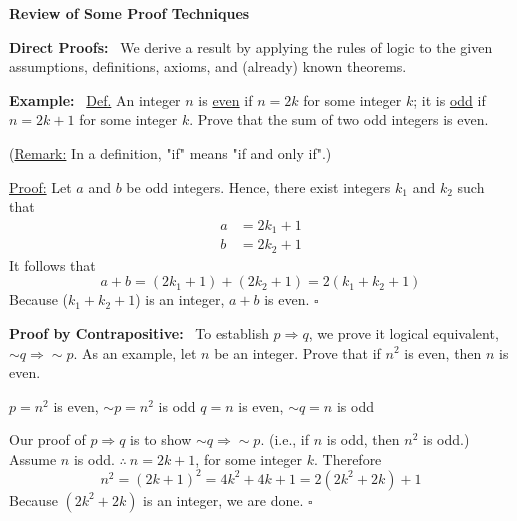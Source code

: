 \documentclass[letterpaper]{article}
\begin{document}
\Large
\begin{center}
\textbf{Review of Some Proof Techniques}
\end{center}

\noindent\textbf{Direct Proofs:}~ We derive a result by applying the rules of logic to the given assumptions, definitions, axioms, and (already) known theorems.

\noindent\textbf{Example:}~
    \newline\underline{Def.} An integer $n$ is \underline{even} if $n = 2k$ for some integer $k$; it is \underline{odd} if \ $n = 2k+1$ for some integer $k$. Prove that the sum of two odd integers is even.

\noindent (\underline{Remark:} In a definition, "if" means "if and only if".)

\noindent \underline{Proof:} Let $a$ and $b$ be odd integers.
    \newline
    Hence, there exist integers $k_1$ and $k_2$ such that
    \begin{align*}
        a &= 2k_1+1\\
        b &= 2k_2+1
    \end{align*}
    It follows that
    \begin{equation*}
        a+b = (2k_1+1) + (2k_2+1) = 2(k_1+k_2+1)
    \end{equation*}
    Because ($k_1+k_2+1$) is an integer, $a+b$ is even. $\square$

\noindent \textbf{Proof by Contrapositive:}~ To establish $p \Rightarrow q$, we prove it logical equivalent, $\sim q \Rightarrow \sim p$.
    \newline\newline
    As an example, let $n$ be an integer. Prove that if $n^2$ is even, then $n$ is even.

    $p = n^2$ is even, $\sim p = n^2$ is odd
    \newline
    $q = n$ is even, $\sim q = n$ is odd

    Our proof of $p \Rightarrow q$ is to show $\sim q \Rightarrow \sim p$. (i.e., if $n$ is odd, then $n^2$ is odd.)
    \newline
    Assume $n$ is odd. $\therefore \ n = 2k+1$, for some integer $k$.
    \newline
    Therefore $$n^2 = (2k+1)^2 = 4k^2 + 4k + 1 = 2(2k^2+2k)+1$$
    \newline
    Because $(2k^2+2k)$ is an integer, we are done. $\square$
\end{document}
